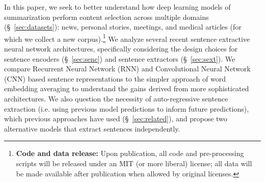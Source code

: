 In this paper, we seek to better understand how deep learning models of 
summarization perform content selection across multiple domains (\S~\ref{sec:datasets}): news, personal stories,
meetings, and medical articles (for which we collect a new corpus).\footnote{\textbf{Code and data release:} Upon
publication, all code and pre-processing scripts
will be released under an MIT (or more liberal)
license; all data will be made available after
publication when allowed by original licenses.}
We analyze
several recent sentence extractive neural network architectures, 
specifically considering the design choices for sentence encoders (\S~\ref{sec:senc})
and sentence extractors (\S~\ref{sec:sext}). We compare Recurrent Neural Network (RNN) and Convolutional Neural
Network (CNN) based sentence representations to the 
simpler approach of word embedding averaging to understand the gains 
derived from more sophisticated architectures.
We also question the necessity of auto-regressive sentence extraction 
(i.e. using previous model predictions to inform future predictions), 
which previous approaches have used (\S~\ref{sec:related}),
and propose two alternative models that extract sentences independently.
%
%
%
%
\\[-0.5em]


